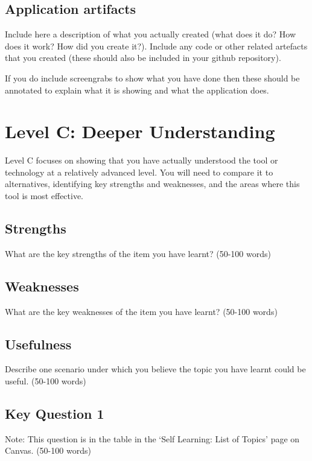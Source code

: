 \documentclass[a4paper, 11pt]{report}
\begin{document}
\subsection{Application artifacts}

Include here a description of what you actually created (what does it do? How does it work? How did you create it?). Include any code or other related artefacts that you created (these should also be included in your github repository).

If you do include screengrabs to show what you have done then these should be annotated to explain what it is showing and what the application does.



\newpage
\section{Level C: Deeper Understanding}

Level C focuses on showing that you have actually understood the tool or technology at a relatively advanced level. You will need to compare it to alternatives, identifying key strengths and weaknesses, and the areas where this tool is most effective. 

\subsection{Strengths}
What are the key strengths of the item you have learnt? (50-100 words)

\subsection{Weaknesses}
What are the key weaknesses of the item you have learnt? (50-100 words)

\subsection{Usefulness}
Describe one scenario under which you believe the topic you have learnt could be useful. (50-100 words)

\subsection{Key Question 1}
Note: This question is in the table in the ‘Self Learning: List of Topics’ page on Canvas. (50-100 words)
\end{document}
